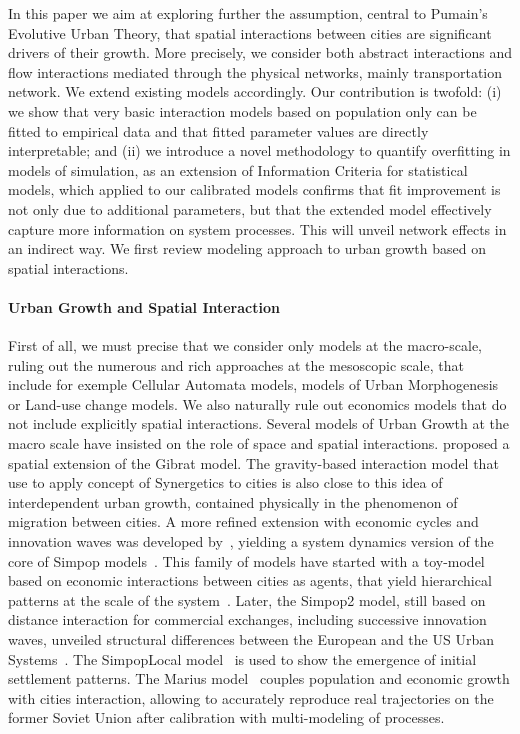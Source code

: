 \documentclass[Royal,sageh,times]{sagej}
\begin{document}
In this paper we aim at exploring further the assumption, central to Pumain's Evolutive Urban Theory, that spatial interactions between cities are significant drivers of their growth. More precisely, we consider both abstract interactions and flow interactions mediated through the physical networks, mainly transportation network. We extend existing models accordingly. Our contribution is twofold: (i) we show that very basic interaction models based on population only can be fitted to empirical data and that fitted parameter values are directly interpretable; and (ii) we introduce a novel methodology to quantify overfitting in models of simulation, as an extension of Information Criteria for statistical models, which applied to our calibrated models confirms that fit improvement is not only due to additional parameters, but that the extended model effectively capture more information on system processes. This will unveil network effects in an indirect way. We first review modeling approach to urban growth based on spatial interactions.


\paragraph{Urban Growth and Spatial Interaction}

First of all, we must precise that we consider only models at the macro-scale, ruling out the numerous and rich approaches at the mesoscopic scale, that include for exemple Cellular Automata models, models of Urban Morphogenesis or Land-use change models. We also naturally rule out economics models that do not include explicitly spatial interactions. Several models of Urban Growth at the macro scale have insisted on the role of space and spatial interactions. \cite{bretagnolle2000long} proposed a spatial extension of the Gibrat model. The gravity-based interaction model that~\cite{sanders1992systeme} use to apply concept of Synergetics to cities is also close to this idea of interdependent urban growth, contained physically in the phenomenon of migration between cities. A more refined extension with economic cycles and innovation waves was developed by~\cite{favaro2011gibrat}, yielding a system dynamics version of the core of Simpop models~\citep{pumain2012multi}. This family of models have started with a toy-model based on economic interactions between cities as agents, that yield hierarchical patterns at the scale of the system~\citep{sanders1997simpop}. Later, the Simpop2 model, still based on distance interaction for commercial exchanges, including successive innovation waves, unveiled structural differences between the European and the US Urban Systems~\citep{bretagnolle2010comparer}. The SimpopLocal model~\citep{pumain2017simpoplocal} is used to show the emergence of initial settlement patterns. The Marius model~\citep{cottineau2014evolution} couples population and economic growth with cities interaction, allowing to accurately reproduce real trajectories on the former Soviet Union after calibration with multi-modeling of processes.
\end{document}
